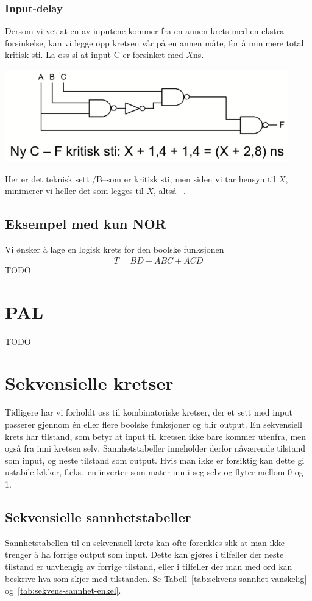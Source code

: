 \documentclass[12pt,a4paper,norsk]{article}
\begin{document}
\subsubsection{Input-delay}
Dersom vi vet at en av inputene kommer fra en annen krets med en ekstra forsinkelse,
kan vi legge opp kretsen vår på en annen måte, for å minimere total kritisk sti. La oss si
at input C er forsinket med $X$\si{\nano\second}.
\begin{center}
  \includegraphics[height=4cm,keepaspectratio]{Krets_CTeknomap}
\end{center}
Her er det teknisk sett \@A/B\@--\@F som er kritisk sti, men siden vi tar hensyn til
$X$, minimerer vi heller det som legges til $X$, altså \@C\@--\@F\@.

\subsection{Eksempel med kun NOR}
Vi ønsker å lage en logisk krets for den boolske funksjonen
\[T = BD + \bar{A}B\bar{C} + \bar{A}CD\]
TODO

\section{PAL}\label{sec:PAL}
TODO

\section{Sekvensielle kretser}
Tidligere har vi forholdt oss til kombinatoriske kretser, der et sett med input
passerer gjennom én eller flere boolske funksjoner og blir output. En sekvensiell
krets har tilstand, som betyr at input til kretsen ikke bare kommer utenfra, men
også fra inni kretsen selv. Sannhetstabeller inneholder derfor nåværende tilstand
som input, og neste tilstand som output. Hvis man ikke er forsiktig kan dette gi
ustabile løkker, f.eks.\ en inverter som mater inn i seg selv og flyter mellom 0
og 1.

\subsection{Sekvensielle sannhetstabeller}
Sannhetstabellen til en sekvensiell krets kan ofte forenkles slik at man ikke
trenger å ha forrige output som input. Dette kan gjøres i tilfeller der neste
tilstand er uavhengig av forrige tilstand, eller i tilfeller der man med ord kan
beskrive hva som skjer med tilstanden. Se
Tabell~\ref{tab:sekvens-sannhet-vanskelig} og~\ref{tab:sekvens-sannhet-enkel}.
\end{document}
